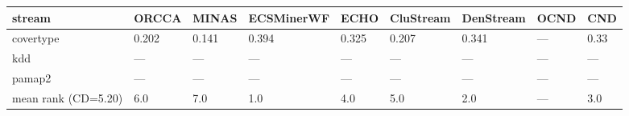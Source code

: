 \begin{tabular}{lllllllll}
\hline
 stream              & ORCCA   & MINAS   & ECSMinerWF   & ECHO   & CluStream   & DenStream   & OCND   & CND   \\
\hline
 covertype           & 0.202   & 0.141   & 0.394        & 0.325  & 0.207       & 0.341       & ---    & 0.33  \\
 kdd                 & ---     & ---     & ---          & ---    & ---         & ---         & ---    & ---   \\
 pamap2              & ---     & ---     & ---          & ---    & ---         & ---         & ---    & ---   \\
 mean rank (CD=5.20) & 6.0     & 7.0     & 1.0          & 4.0    & 5.0         & 2.0         & ---    & 3.0   \\
\hline
\end{tabular}